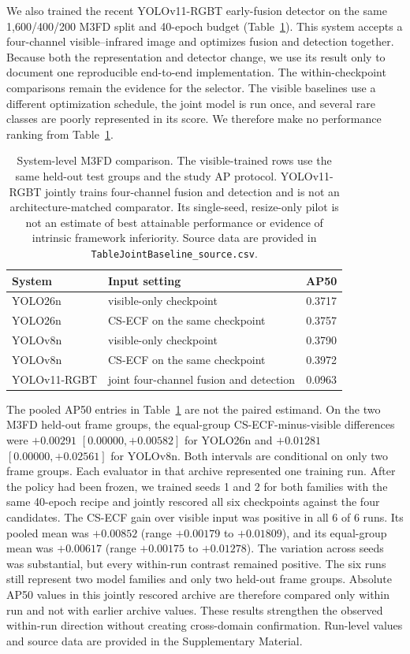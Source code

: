 \documentclass[preprint,11pt]{elsarticle}
\begin{document}
We also trained the recent YOLOv11-RGBT early-fusion detector on the same
1,600/400/200 M3FD split and 40-epoch budget
(Table~\ref{tab:joint-baseline}). This system accepts a four-channel
visible--infrared image and optimizes fusion and detection together. Because
both the representation and detector change, we use its result only to
document one reproducible end-to-end implementation. The within-checkpoint
comparisons remain the evidence for the selector. The visible baselines use a
different optimization schedule, the joint model is run once, and several rare
classes are poorly represented in its score. We therefore make no performance
ranking from Table~\ref{tab:joint-baseline}.

\begin{table}[t]
\centering
\small
\caption{System-level M3FD comparison. The visible-trained rows use the same
held-out test groups and the study AP protocol. YOLOv11-RGBT jointly trains
four-channel fusion and detection and is not an architecture-matched
comparator. Its single-seed, resize-only pilot is not an estimate of best
attainable performance or evidence of intrinsic framework inferiority. Source
data are provided in
\texttt{TableJointBaseline\_source.csv}.}
\label{tab:joint-baseline}
\begin{tabular}{@{}llc@{}}
\toprule
System & Input setting & AP50 \\
\midrule
YOLO26n & visible-only checkpoint & 0.3717 \\
YOLO26n & CS-ECF on the same checkpoint & 0.3757 \\
YOLOv8n & visible-only checkpoint & 0.3790 \\
YOLOv8n & CS-ECF on the same checkpoint & 0.3972 \\
YOLOv11-RGBT & joint four-channel fusion and detection & 0.0963 \\
\bottomrule
\end{tabular}
\end{table}

The pooled AP50 entries in Table~\ref{tab:joint-baseline} are not the paired
estimand. On the two M3FD held-out frame groups, the equal-group
CS-ECF-minus-visible differences were \(+0.00291\) \([0.00000,+0.00582]\) for
YOLO26n and \(+0.01281\) \([0.00000,+0.02561]\) for YOLOv8n. Both intervals
are conditional on only two frame groups. Each evaluator in that archive
represented one training run. After the policy had been frozen, we trained
seeds 1 and 2 for both families with the same 40-epoch recipe and jointly
rescored all six checkpoints against the four candidates. The CS-ECF gain over
visible input was positive in all 6 of 6 runs. Its pooled mean was \(+0.00852\)
(range \(+0.00179\) to \(+0.01809\)), and its equal-group mean was \(+0.00617\)
(range \(+0.00175\) to \(+0.01278\)). The variation across seeds was
substantial, but every within-run contrast remained positive. The six runs
still represent two model families and only two held-out frame groups. Absolute
AP50 values in this jointly rescored archive are therefore compared only within
run and not with earlier archive values. These results strengthen the observed
within-run direction without creating cross-domain confirmation.
Run-level values and source data are provided in the Supplementary Material.
\end{document}
